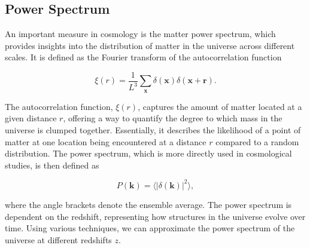 \documentclass{article}
\begin{document}
\subsection{Power Spectrum}
\label{power-spectrum}
An important measure in cosmology is the matter power spectrum, which provides insights into the distribution of matter in the universe across different scales. It is defined as the Fourier transform of the autocorrelation function

\begin{equation}
\xi(r) = \frac{1}{L^3} \sum_{\mathbf{x}} \delta(\mathbf{x}) \delta(\mathbf{x} + \mathbf{r}).
\end{equation}

The autocorrelation function, \(\xi(r)\), captures the amount of matter located at a given distance \(r\), offering a way to quantify the degree to which mass in the universe is clumped together. Essentially, it describes the likelihood of a point of matter at one location being encountered at a distance \(r\) compared to a random distribution. The power spectrum, which is more directly used in cosmological studies, is then defined as \citep{cui2008ideal}

\begin{equation}
    P(\mathbf{k}) = \langle |\delta(\mathbf{k})|^2 \rangle,
\end{equation}

where the angle brackets denote the ensemble average. The power spectrum is dependent on the redshift, representing how structures in the universe evolve over time. Using various techniques, we can approximate the power spectrum of the universe at different redshifts \(z\). 
\end{document}
